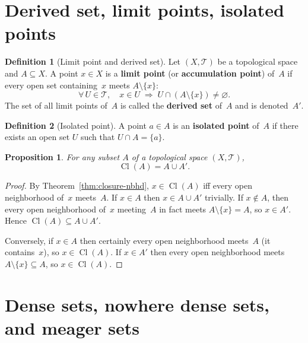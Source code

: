 \documentclass[11pt,a4paper,twoside]{book}
\newtheorem{proposition}[theorem]{Proposition}
\theoremstyle{remark}
\theoremstyle{definition}
\theoremstyle{definition}
\newtheorem{definition}{Definition}[section]
\newcommand{\Tau}{\mathcal{T}}           %
\DeclareMathOperator{\Cl}{Cl}
\begin{document}
\section{Derived set, limit points, isolated points}
\label{sec:derived-set}

\begin{definition}[Limit point and derived set]\label{def:limit-point}
Let $(X,\Tau)$ be a topological space and $A\subseteq X$.  A point $x\in X$
is a \textbf{limit point} (or \textbf{accumulation point}) of~$A$ if every
open set containing~$x$ meets $A\setminus\{x\}$:
\[
  \forall\, U\in\Tau,\quad x\in U
  \;\Longrightarrow\; U\cap(A\setminus\{x\})\neq\varnothing.
\]
The set of all limit points of~$A$ is called the \textbf{derived set} of~$A$
and is denoted~$A'$.
\end{definition}

\begin{definition}[Isolated point]\label{def:isolated-point}
A point $a\in A$ is an \textbf{isolated point} of~$A$ if there exists an open
set $U$ such that $U\cap A=\{a\}$.
\end{definition}

\begin{proposition}\label{prop:closure-derived}
For any subset $A$ of a topological space $(X,\Tau)$,
\[
  \Cl(A) = A\cup A'.
\]
\end{proposition}

\begin{proof}
By Theorem~\ref{thm:closure-nbhd}, $x\in\Cl(A)$ iff every open neighborhood
of~$x$ meets~$A$.  If $x\in A$ then $x\in A\cup A'$ trivially.  If
$x\notin A$, then every open neighborhood of~$x$ meeting~$A$ in fact meets
$A\setminus\{x\}=A$, so $x\in A'$.  Hence $\Cl(A)\subseteq A\cup A'$.

Conversely, if $x\in A$ then certainly every open neighborhood meets~$A$
(it contains~$x$), so $x\in\Cl(A)$.  If $x\in A'$ then every open neighborhood
meets $A\setminus\{x\}\subseteq A$, so $x\in\Cl(A)$.
\end{proof}


\section{Dense sets, nowhere dense sets, and meager sets}
\label{sec:dense-nowhere-dense}
\end{document}
